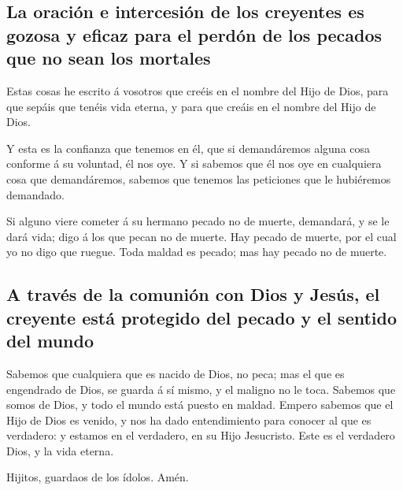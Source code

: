 \hypertarget{la-oraciuxf3n-e-intercesiuxf3n-de-los-creyentes-es-gozosa-y-eficaz-para-el-perduxf3n-de-los-pecados-que-no-sean-los-mortales}{%
\subsection{La oración e intercesión de los creyentes es gozosa y eficaz
para el perdón de los pecados que no sean los
mortales}\label{la-oraciuxf3n-e-intercesiuxf3n-de-los-creyentes-es-gozosa-y-eficaz-para-el-perduxf3n-de-los-pecados-que-no-sean-los-mortales}}

 Estas cosas he escrito á vosotros que creéis en el nombre
del Hijo de Dios, para que sepáis que tenéis vida eterna, y para que
creáis en el nombre del Hijo de Dios.

 Y esta es la confianza que tenemos en él, que si
demandáremos alguna cosa conforme á su voluntad, él nos oye.
 Y si sabemos que él nos oye en cualquiera cosa que
demandáremos, sabemos que tenemos las peticiones que le hubiéremos
demandado.

 Si alguno viere cometer á su hermano pecado no de muerte,
demandará, y se le dará vida; digo á los que pecan no de muerte. Hay
pecado de muerte, por el cual yo no digo que ruegue.  Toda
maldad es pecado; mas hay pecado no de muerte.

\hypertarget{a-travuxe9s-de-la-comuniuxf3n-con-dios-y-jesuxfas-el-creyente-estuxe1-protegido-del-pecado-y-el-sentido-del-mundo}{%
\subsection{A través de la comunión con Dios y Jesús, el creyente está
protegido del pecado y el sentido del
mundo}\label{a-travuxe9s-de-la-comuniuxf3n-con-dios-y-jesuxfas-el-creyente-estuxe1-protegido-del-pecado-y-el-sentido-del-mundo}}

 Sabemos que cualquiera que es nacido de Dios, no peca; mas
el que es engendrado de Dios, se guarda á sí mismo, y el maligno no le
toca.  Sabemos que somos de Dios, y todo el mundo está
puesto en maldad.  Empero sabemos que el Hijo de Dios es
venido, y nos ha dado entendimiento para conocer al que es verdadero: y
estamos en el verdadero, en su Hijo Jesucristo. Este es el verdadero
Dios, y la vida eterna.

 Hijitos, guardaos de los ídolos. Amén.
